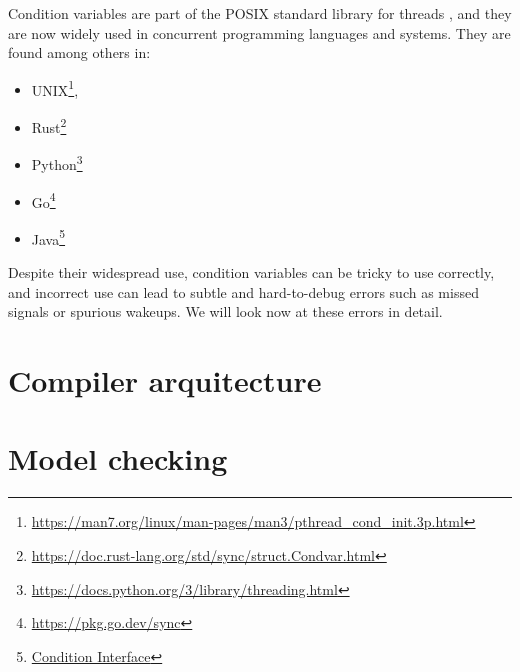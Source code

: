 \documentclass[../Thesis.tex]{subfiles}
\begin{document}
Condition variables are part of the POSIX standard library
for threads \cite{nichols1996pthreads},
and they are now widely used in concurrent programming languages and systems.
They are found among others in:

\begin{itemize}
    \item UNIX\footnote{\url{https://man7.org/linux/man-pages/man3/pthread_cond_init.3p.html}},
    \item Rust\footnote{\url{https://doc.rust-lang.org/std/sync/struct.Condvar.html}}
    \item Python\footnote{\url{https://docs.python.org/3/library/threading.html}}
    \item Go\footnote{\url{https://pkg.go.dev/sync}}
    \item Java\footnote{
              \href{https://docs.oracle.com/en/java/javase/20/docs/api/java.base/java/util/concurrent/locks/Condition.html}
              {Condition Interface}}
\end{itemize}

Despite their widespread use, condition variables can be tricky to use correctly,
and incorrect use can lead to subtle and
hard-to-debug errors such as missed signals or spurious wakeups.
We will look now at these errors in detail.

\section{Compiler arquitecture}

\section{Model checking}
\end{document}
